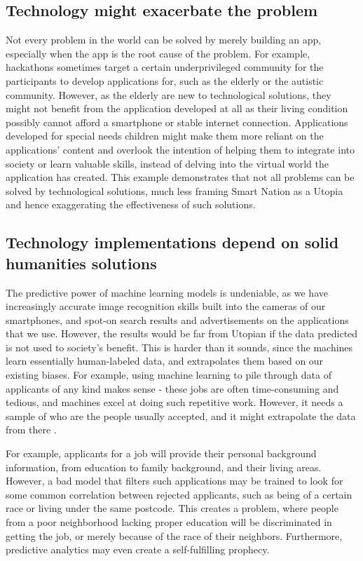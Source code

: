 \documentclass[11pt]{article}
\begin{document}
\subsection{Technology might exacerbate the problem}
\label{sec:orgeaee021}
Not every problem in the world can be solved by merely building an app,
especially when the app is the root cause of the problem. For example,
hackathons sometimes target a certain underprivileged community for the
participants to develop applications for, such as the elderly or the autistic
community. However, as the elderly are new to technological solutions, they
might not benefit from the application developed at all as their living
condition possibly cannot afford a smartphone or stable internet connection.
Applications developed for special needs children might make them more reliant
on the applications' content and overlook the intention of helping them to
integrate into society or learn valuable skills, instead of delving into the
virtual world the application has created. This example demonstrates that not
all problems can be solved by technological solutions, much less framing Smart
Nation as a Utopia and hence exaggerating the effectiveness of such solutions.
\subsection{Technology implementations depend on solid humanities solutions}
\label{sec:org7944843}
The predictive power of machine learning models is undeniable, as we have
increasingly accurate image recognition skills built into the cameras of our
smartphones, and spot-on search results and advertisements on the applications
that we use. However, the results would be far from Utopian if the data
predicted is not used to society's benefit. This is harder than it sounds,
since the machines learn essentially human-labeled data, and extrapolates them
based on our existing biases. For example, using machine learning to pile
through data of applicants of any kind makes sense - these jobs are often
time-consuming and tedious, and machines excel at doing such repetitive work.
However, it needs a sample of who are the people usually accepted, and it might
extrapolate the data from there \cite{racist_robots}.

For example, applicants for a job will provide their personal background
information, from education to family background, and their living areas.
However, a bad model that filters such applications may be trained to look for
some common correlation between rejected applicants, such as being of a certain
race or living under the same postcode. This creates a problem, where people
from a poor neighborhood lacking proper education will be discriminated in
getting the job, or merely because of the race of their neighbors. Furthermore,
predictive analytics may even create a self-fulfilling prophecy.
\end{document}
